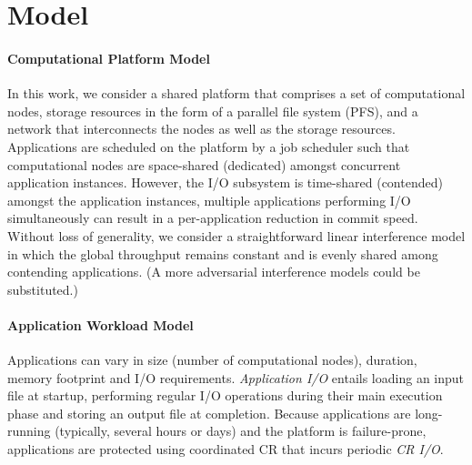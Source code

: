 
\section{Model}
\label{sec:model}


\paragraph{Computational Platform Model}
In this work, we consider a shared platform that comprises a set of computational
nodes, storage resources in the form of a parallel file system (PFS), and a network
that interconnects the nodes as well as the storage resources. Applications are
scheduled on the platform by a job scheduler such that computational nodes are
space-shared (dedicated) amongst concurrent application instances. However, the I/O
subsystem is time-shared (contended) amongst the application instances, \ie multiple
applications performing I/O simultaneously can result in a per-application reduction
in commit speed. Without loss of generality, we consider a straightforward linear
interference model in which the global throughput remains constant and is evenly
shared among contending applications. (A more adversarial interference models could
be substituted.)

\paragraph{Application Workload Model}
Applications can vary in size (number of computational nodes), duration, memory
footprint and I/O requirements.  \emph{Application I/O} entails loading an input file
at startup, performing regular I/O operations during their main execution phase and
storing an output file at completion. Because applications are long-running
(typically, several hours or days) and the platform is failure-prone, applications
are protected using coordinated CR that incurs periodic \emph{CR I/O}.

